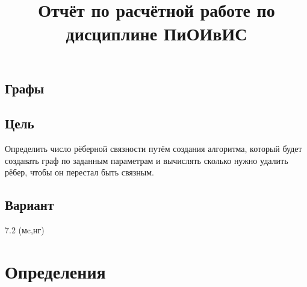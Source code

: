 \documentclass[12pt]{article}
\title{Отчёт по расчётной работе по дисциплине ПиОИвИС}
\author{}
\date{}
\begin{document}
\maketitle

\begin{center}
\section*{Графы}
\end{center}

\subsection*{Цель}
Определить число рёберной связности путём создания алгоритма, который будет создавать граф по заданным параметрам и вычислять сколько нужно удалить рёбер, чтобы он перестал быть связным.

\subsection*{Вариант}
7.2 (мc,нг)

\section*{Определения}
\end{document}

